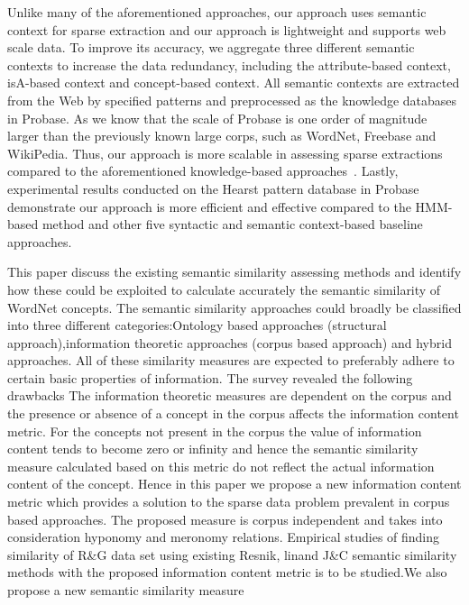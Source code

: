 {\color{red} Unlike many of the aforementioned approaches, our approach uses
semantic context for sparse extraction and our approach is lightweight
and supports web scale data.  To improve its accuracy, we aggregate
three different semantic contexts to increase the data redundancy,
including the attribute-based context, isA-based context and
concept-based context. All semantic contexts are extracted from the
Web by specified patterns and preprocessed as the knowledge databases
in Probase. As we know that the scale of Probase is one order of
magnitude larger than the previously known large
corps\cite{12MSRA:Probase}, such as WordNet\cite{Ritter:What},
Freebase and WikiPedia. Thus, our approach is more scalable in assessing
sparse extractions compared to the aforementioned knowledge-based
approaches~\cite{Wu:Open}\cite{Yao:Collective}. Lastly, experimental
results conducted on the Hearst pattern database in Probase
demonstrate our approach is more efficient and effective compared to
the HMM-based method and other five syntactic and semantic
context-based baseline approaches.

This paper discuss the existing semantic similarity assessing methods and identify how these could be exploited to calculate accurately the semantic similarity of WordNet concepts. The semantic similarity approaches could broadly be classified into three different categories:Ontology based approaches (structural approach),information theoretic approaches (corpus based approach) and hybrid approaches.
All of these similarity measures are expected to preferably adhere to certain basic properties of information. The survey revealed the following drawbacks The information theoretic measures are dependent on the corpus and the presence or absence of a concept in the corpus affects the information content metric. For the concepts not present in the corpus the value of information content tends to become zero or infinity and hence the semantic similarity measure calculated based on this metric do not reflect the actual information content of the concept. Hence in this paper we propose a new information content metric which provides a solution to the sparse data problem prevalent in corpus based approaches. The proposed measure is corpus independent and takes into consideration hyponomy and meronomy relations. Empirical studies of finding similarity of R\&G data set using existing Resnik, linand J\&C semantic similarity methods with the proposed information content metric is to be studied.We also propose a new semantic similarity measure
}

